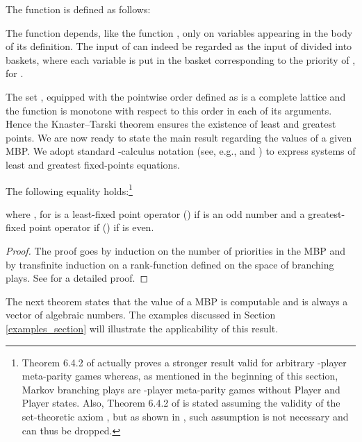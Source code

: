 \begin{definition}\label{definition_of_g}
The function  is defined as follows:
\begin{center}

\end{center}
\end{definition}

The function  depends, like the function ,  only on  variables  appearing in the body of its definition. The input of  can indeed be regarded as the input of  divided into  baskets, where each variable  is put in the basket corresponding  to the priority of , for .

The set , equipped with the pointwise order defined as  is a complete lattice and the function  is monotone with respect to this order in each of its arguments. Hence the Knaster--Tarski theorem ensures the existence of least and greatest points.  We are now ready to state the main result regarding the values of a given MBP. We adopt standard -calculus notation (see, e.g., \cite{Rudiments2001} and \cite{MioThesis,MIO2012b}) to express systems of least and greatest fixed-points equations.
\begin{theorem}\label{main_theorem_MBP}
\label{corr1}
The following equality holds:\footnote{Theorem 6.4.2 of \cite{MioThesis} actually proves a stronger result valid for arbitrary -player meta-parity games whereas, as mentioned in the beginning of this section, Markov branching plays are -player meta-parity games without Player  and Player  states. Also, Theorem 6.4.2 of \cite{MioThesis} is stated assuming the validity of the set-theoretic axiom , but as shown in \cite{GMMS2014}, such assumption is not necessary and can thus be dropped. 
}



where , for  is a least-fixed point operator () if  is an odd number and a greatest-fixed point operator if () if  is even.
\end{theorem}
\begin{proof}
The proof goes by induction on the number of priorities in the MBP  and by transfinite induction on a rank-function defined on the space of branching plays.  See \cite{MioThesis} for a detailed proof.
\end{proof}

\noindent


The next theorem states that the value of a MBP is computable and is always a vector of algebraic numbers. 
The examples discussed in Section \ref{examples_section} will illustrate the applicability of this result.


